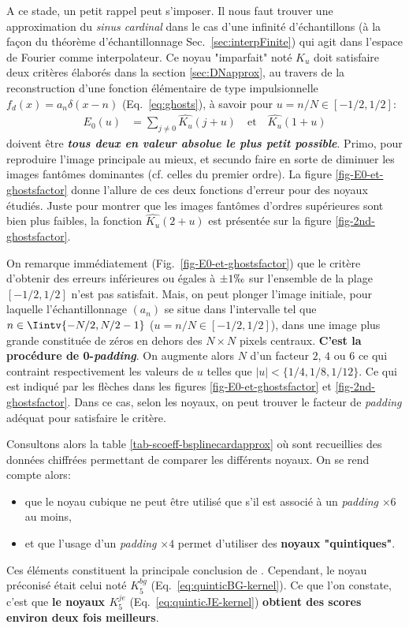 \documentclass[11pt,twoside]{article}
\newcommand{\itemb}{\item[$\bullet$]}
\newcommand*\textitbf[1]{\textit{\textbf{#1}}}
\begin{document}
A ce stade, un petit rappel peut s'imposer. Il nous faut trouver une approximation du \textit{sinus cardinal} dans le cas d'une infinité d'échantillons (à la façon du théorème d'échantillonnage Sec.~\ref{sec:interpFinite}) qui agit dans l'espace de Fourier comme interpolateur. Ce noyau "imparfait" noté $K_u$ doit satisfaire deux critères élaborés dans la section \ref{sec:DNapprox}, au travers de la reconstruction d'une fonction élémentaire de type impulsionnelle $f_d(x)=a_n \delta(x-n)$ (Eq.~\ref{eq:ghosts}), à savoir pour $u=n/N\in[-1/2, 1/2]$:
\begin{align}
E_0(u) &= \sum_{j\neq 0} \widehat{K_u}(j+u)
\quad \mathrm{et}\quad  \widehat{K_u}(1+u)
\label{eq:error-funct}
\end{align}
doivent être \textitbf{tous deux en valeur absolue le plus petit possible}. Primo, pour reproduire l'image principale au mieux, et secundo faire en sorte de diminuer les images fantômes dominantes (cf. celles du premier ordre). La figure \ref{fig-E0-et-ghostsfactor} donne l'allure de ces deux fonctions d'erreur pour des noyaux étudiés. 
Juste pour montrer que les images fantômes d'ordres supérieures sont bien plus faibles, la fonction $\widehat{K_u}(2+u)$ est présentée sur la figure \ref{fig-2nd-ghostsfactor}.

On remarque immédiatement (Fig.~\ref{fig-E0-et-ghostsfactor}) que le critère d'obtenir des erreurs inférieures ou égales à $\pm 1\permil$ sur l'ensemble de la plage $[-1/2, 1/2]$ n'est pas satisfait. Mais, on peut plonger l'image initiale, pour laquelle l'échantillonnage $(a_n)$  se situe dans l'intervalle tel que $n\in\Iintv{-N/2,N/2-1}$ ($u=n/N \in [-1/2,1/2]$), dans une image plus grande constituée de zéros en dehors des $N\times N$ pixels centraux. \textbf{C'est la procédure de 0-\textit{padding}}. On augmente alors $N$ d'un facteur $2$, $4$ ou $6$ ce qui contraint respectivement les valeurs de $u$ telles que $|u|<\{1/4,1/8,1/12\}$. Ce qui est indiqué par les flèches dans les figures  \ref{fig-E0-et-ghostsfactor} et \ref{fig-2nd-ghostsfactor}. Dans ce cas, selon les noyaux, on peut trouver le facteur de \textit{padding} adéquat pour satisfaire le critère.  


Consultons alors la table \ref{tab-scoeff-bsplinecardapprox} où sont recueillies des données chiffrées permettant de comparer les différents noyaux. On se rend compte alors:
\begin{itemize}
\itemb que le noyau cubique ne peut être utilisé que s'il est associé à un \textit{padding} $\times 6$ au moins,
\itemb et que l'usage d'un \textit{padding} $\times 4$ permet d'utiliser des \textbf{noyaux "quintiques"}.
\end{itemize} 
Ces éléments constituent la principale conclusion de \cite{2014PASP..126..287B}. Cependant, le noyau préconisé était celui noté $K_5^{bg}$ (Eq.~\ref{eq:quinticBG-kernel}). Ce que l'on constate, c'est que \textbf{le noyaux $K_5^{je}$ }(Eq.~\ref{eq:quinticJE-kernel}) \textbf{obtient des scores environ deux fois meilleurs}.
\end{document}
